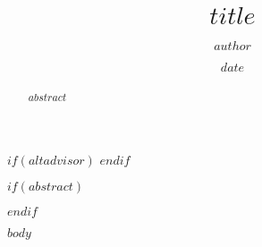 \documentclass[12pt,twoside]{reedthesis}
\begin{document}
    \ifhaveObjects
        {\realSingleSpace \listofObjects}%
    \fi


\title{$title$}
\author{$author$}
\date{$date$}
$if(altadvisor)$
$endif$

$if(abstract)$
  \begin{abstract}
    $abstract$
  \end{abstract}
$endif$

\mainmatter %
\pagestyle{fancyplain} %

$body$


\end{document}
